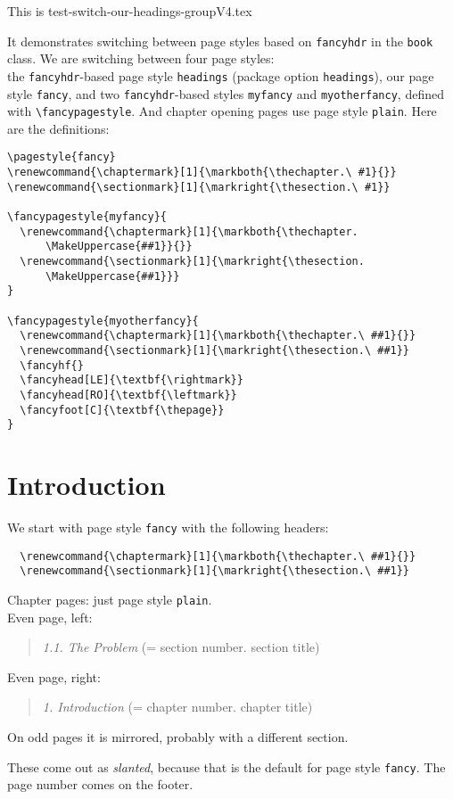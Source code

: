 \documentclass[openany]{book}
\renewcommand{\chaptermark}[1]{\markboth{\thechapter.\ #1}{}}
\renewcommand{\sectionmark}[1]{\markright{\thesection.\ #1}}
\renewcommand{\chaptermark}[1]{\markboth{\thechapter.
      \MakeUppercase{##1}}{}}
\renewcommand{\sectionmark}[1]{\markright{\thesection.
      \MakeUppercase{##1}}}
\renewcommand{\chaptermark}[1]{\markboth{\thechapter.\ ##1}{}}
\renewcommand{\sectionmark}[1]{\markright{\thesection.\ ##1}}
\begin{document}
\tableofcontents

\newpage
\thispagestyle{plain}

\noindent
\begin{boxedminipage}{\textwidth}
  This is test-switch-our-headings-groupV4.tex

It demonstrates switching between page styles based on
\texttt{fancyhdr} in the \texttt{book} class. We are switching between
four page styles:\\ the \texttt{fancyhdr}-based page style
\texttt{headings} (package option \texttt{headings}), our page style
\texttt{fancy}, and two \texttt{fancyhdr}-based styles \texttt{myfancy}
and \texttt{myotherfancy}, defined with \verb|\fancypagestyle|. And
chapter opening pages use page style \texttt{plain}.
  Here are the definitions:

\begin{verbatim}
\pagestyle{fancy}
\renewcommand{\chaptermark}[1]{\markboth{\thechapter.\ #1}{}}
\renewcommand{\sectionmark}[1]{\markright{\thesection.\ #1}}

\fancypagestyle{myfancy}{
  \renewcommand{\chaptermark}[1]{\markboth{\thechapter.
      \MakeUppercase{##1}}{}}
  \renewcommand{\sectionmark}[1]{\markright{\thesection.
      \MakeUppercase{##1}}}
}

\fancypagestyle{myotherfancy}{
  \renewcommand{\chaptermark}[1]{\markboth{\thechapter.\ ##1}{}}
  \renewcommand{\sectionmark}[1]{\markright{\thesection.\ ##1}}
  \fancyhf{}
  \fancyhead[LE]{\textbf{\rightmark}}
  \fancyhead[RO]{\textbf{\leftmark}}
  \fancyfoot[C]{\textbf{\thepage}}
}
\end{verbatim}
\end{boxedminipage}

\chapter{Introduction}

\noindent
\begin{boxedminipage}{\textwidth}
We start with page style \texttt{fancy} with the following headers:
\begin{verbatim}
  \renewcommand{\chaptermark}[1]{\markboth{\thechapter.\ ##1}{}}
  \renewcommand{\sectionmark}[1]{\markright{\thesection.\ ##1}}
\end{verbatim}
%
Chapter pages: just page style \texttt{plain}.
\\
Even page, left:
\begin{quote}
  \textsl{1.1. The Problem} (= section number. section title)
\end{quote}
Even page, right:
\begin{quote}
  \textsl{1. Introduction} (= chapter number. chapter title)
\end{quote}
On odd pages it is mirrored, probably with a different section.

These come out as \textsl{slanted}, because that is the default for page style \texttt{fancy}.
The page number comes on the footer.
\end{boxedminipage}
\bigskip
\end{document}
